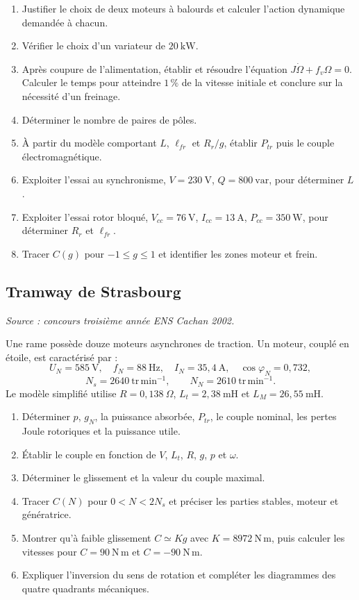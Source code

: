 \begin{enumerate}
  \item Justifier le choix de deux moteurs à balourds et calculer l'action dynamique demandée à chacun.
  \item Vérifier le choix d'un variateur de $20\ \mathrm{kW}$.
  \item Après coupure de l'alimentation, établir et résoudre l'équation $J\dot\Omega+f_v\Omega=0$. Calculer le temps pour atteindre $1\,\%$ de la vitesse initiale et conclure sur la nécessité d'un freinage.
  \item Déterminer le nombre de paires de pôles.
  \item À partir du modèle comportant $L$, $\ell_{fr}$ et $R_r/g$, établir $P_{tr}$ puis le couple électromagnétique.
  \item Exploiter l'essai au synchronisme, $V=230\ \mathrm V$, $Q=800\ \mathrm{var}$, pour déterminer $L$.
  \item Exploiter l'essai rotor bloqué, $V_{cc}=76\ \mathrm V$, $I_{cc}=13\ \mathrm A$, $P_{cc}=350\ \mathrm W$, pour déterminer $R_r$ et $\ell_{fr}$.
  \item Tracer $C(g)$ pour $-1\leq g\leq1$ et identifier les zones moteur et frein.
\end{enumerate}

\subsection{Tramway de Strasbourg}

\textit{Source : concours troisième année ENS Cachan 2002.}


Une rame possède douze moteurs asynchrones de traction. Un moteur, couplé en étoile, est caractérisé par :
\[
U_N=585\ \mathrm V,\quad f_N=88\ \mathrm{Hz},\quad I_N=35{,}4\ \mathrm A,\quad
\cos\varphi_N=0{,}732,
\]
\[
N_s=2640\ \mathrm{tr\,min^{-1}},\qquad N_N=2610\ \mathrm{tr\,min^{-1}}.
\]
Le modèle simplifié utilise $R=0{,}138\ \Omega$, $L_t=2{,}38\ \mathrm{mH}$ et $L_M=26{,}55\ \mathrm{mH}$.

\begin{enumerate}
  \item Déterminer $p$, $g_N$, la puissance absorbée, $P_{tr}$, le couple nominal, les pertes Joule rotoriques et la puissance utile.
  \item Établir le couple en fonction de $V$, $L_t$, $R$, $g$, $p$ et $\omega$.
  \item Déterminer le glissement et la valeur du couple maximal.
  \item Tracer $C(N)$ pour $0<N<2N_s$ et préciser les parties stables, moteur et génératrice.
  \item Montrer qu'à faible glissement $C\simeq Kg$ avec $K=8972\ \mathrm{N\,m}$, puis calculer les vitesses pour $C=90\ \mathrm{N\,m}$ et $C=-90\ \mathrm{N\,m}$.
  \item Expliquer l'inversion du sens de rotation et compléter les diagrammes des quatre quadrants mécaniques.
\end{enumerate}

